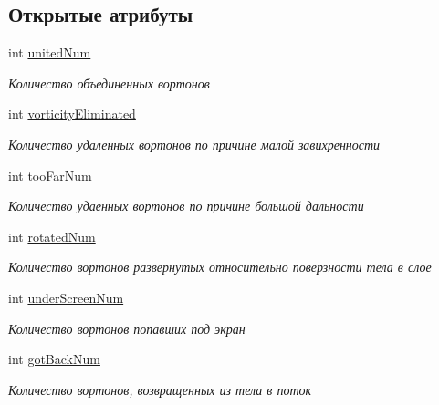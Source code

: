 \subsection*{Открытые атрибуты}
\begin{DoxyCompactItemize}
\item 
\mbox{\label{struct_counters_a25dfd9fbd5facab72c59c8024734e8a1}} 
int \mbox{\hyperlink{struct_counters_a25dfd9fbd5facab72c59c8024734e8a1}{united\+Num}}
\begin{DoxyCompactList}\small\item\em Количество объединенных вортонов \end{DoxyCompactList}\item 
\mbox{\label{struct_counters_a3e855ce145906bd0246d80021563a57f}} 
int \mbox{\hyperlink{struct_counters_a3e855ce145906bd0246d80021563a57f}{vorticity\+Eliminated}}
\begin{DoxyCompactList}\small\item\em Количество удаленных вортонов по причине малой завихренности \end{DoxyCompactList}\item 
\mbox{\label{struct_counters_a0f45ba66e6ced122c253acf0c01cceee}} 
int \mbox{\hyperlink{struct_counters_a0f45ba66e6ced122c253acf0c01cceee}{too\+Far\+Num}}
\begin{DoxyCompactList}\small\item\em Количество удаенных вортонов по причине большой дальности \end{DoxyCompactList}\item 
\mbox{\label{struct_counters_a126045df7733c4b9ae18398d286641a6}} 
int \mbox{\hyperlink{struct_counters_a126045df7733c4b9ae18398d286641a6}{rotated\+Num}}
\begin{DoxyCompactList}\small\item\em Количество вортонов развернутых относительно поверзности тела в слое \end{DoxyCompactList}\item 
\mbox{\label{struct_counters_aaa22410dbe5aeb0a3d119036ae64443d}} 
int \mbox{\hyperlink{struct_counters_aaa22410dbe5aeb0a3d119036ae64443d}{under\+Screen\+Num}}
\begin{DoxyCompactList}\small\item\em Количество вортонов попавших под экран \end{DoxyCompactList}\item 
\mbox{\label{struct_counters_af05db26ce99b16212f87dc4586329aee}} 
int \mbox{\hyperlink{struct_counters_af05db26ce99b16212f87dc4586329aee}{got\+Back\+Num}}
\begin{DoxyCompactList}\small\item\em Количество вортонов, возвращенных из тела в поток \end{DoxyCompactList}\end{DoxyCompactItemize}


